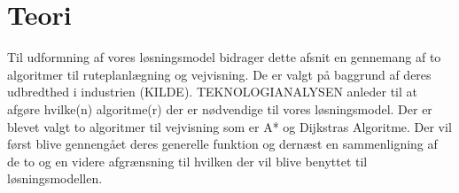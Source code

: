 \chapter{Teori}\label{Teori}
Til udformning af vores løsningsmodel bidrager dette afsnit en gennemang af to algoritmer til ruteplanlægning og vejvisning. De er valgt på baggrund af deres udbredthed i industrien (KILDE). TEKNOLOGIANALYSEN anleder til at afgøre hvilke(n) algoritme(r) der er nødvendige til vores løsningsmodel. Der er blevet valgt to algoritmer til vejvisning som er A* og Dijkstras Algoritme.
Der vil først blive gennengået deres generelle funktion og dernæst en sammenligning af de to og en videre afgrænsning til hvilken der vil blive benyttet til løsningsmodellen.




















